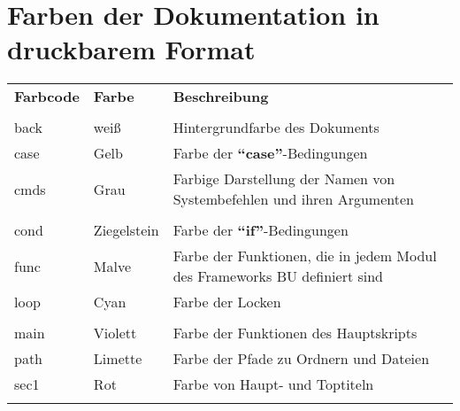 \documentclass[a4paper,10pt]{article}
\begin{document}
    \newpage





    \color{red}
    \section{Farben der Dokumentation in druckbarem Format}\color{text}

    \begin{justify}
        \begin{tabular}{lll}
            \textbf{Farbcode} & \textbf{Farbe}          & \textbf{Beschreibung}\\\\

            \color{text}back  & \color{text}weiß        & \color{text}Hintergrundfarbe des Dokuments\\
            \color{case}case  & \color{case}Gelb        & \color{case}Farbe der \textbf{``case''}-Bedingungen\\
            \color{cmds}cmds  & \color{cmds}Grau        & \color{cmds}Farbige Darstellung der Namen von Systembefehlen und ihren Argumenten\\\\

            \color{cond}cond  & \color{cond}Ziegelstein & \color{cond}Farbe der \textbf{``if''}-Bedingungen\\
            \color{func}func  & \color{func}Malve       & \color{func}Farbe der Funktionen, die in jedem Modul des Frameworks BU definiert sind\\
            \color{loop}loop  & \color{loop}Cyan        & \color{loop}Farbe der Locken\\\\

            \color{main}main  & \color{main}Violett     & \color{main}Farbe der Funktionen des Hauptskripts\\
            \color{path}path  & \color{path}Limette     & \color{path}Farbe der Pfade zu Ordnern und Dateien\\
            \color{sec1}sec1  & \color{sec1}Rot         & \color{sec1}Farbe von Haupt- und Toptiteln\\\\


\end{tabular}
\end{justify}
\end{document}

